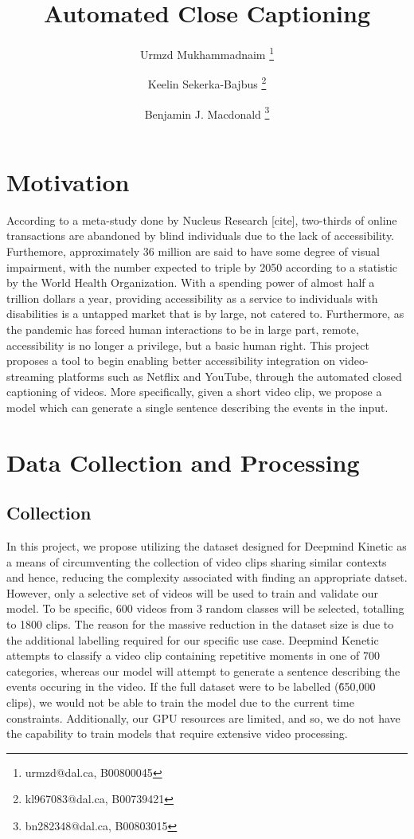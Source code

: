 \documentclass[11pt]{article}
\title{Automated Close Captioning}
\author[1]{Urmzd Mukhammadnaim \thanks{urmzd@dal.ca, B00800045}}
\author[1]{Keelin Sekerka-Bajbus \thanks{kl967083@dal.ca, B00739421 }}
\author[1]{Benjamin J. Macdonald \thanks{bn282348@dal.ca, B00803015}}
\affil[1]{Faculty of Computer Science, Dalhousie University}
\begin{document}
\maketitle

\section{Motivation}
According to a meta-study done by Nucleus Research [cite], two-thirds
of online transactions are abandoned by blind individuals due to the lack of accessibility.
Furthemore, approximately 36 million are said to have some degree of visual impairment, with the number
expected to triple by 2050 according to a statistic by the World Health Organization.
With a spending power of almost half a trillion dollars a year, providing accessibility
as a service to individuals with disabilities is a untapped market that is by large, not catered to.
Furthermore, as the pandemic has forced human interactions to be in large part, remote, accessibility is no longer
a privilege, but a basic human right. This project proposes a tool to begin enabling better accessibility
integration on video-streaming platforms such as Netflix and YouTube, through the automated
closed captioning of videos. More specifically, given a short video clip, we propose a model which
can generate a single sentence describing the events in the input.

\newpage
\section{Data Collection and Processing}
\subsection{Collection}
In this project, we propose utilizing the dataset designed for Deepmind Kinetic as a means of
circumventing the collection of video clips sharing similar contexts and hence, reducing the complexity associated
with finding an appropriate datset. However, only a selective set of videos will be used to train and validate
our model. To be specific, 600 videos from 3 random classes will be selected, totalling
to 1800 clips. The reason for the massive reduction in the dataset size is due to the additional labelling
required for our specific use case. Deepmind Kenetic attempts to classify a video clip containing repetitive moments
in one of 700 categories, whereas our model will attempt to generate a sentence describing the events occuring in the video.
If the full dataset were to be labelled (\~650,000 clips), we would not be able to train the model due to the current time
constraints. Additionally, our GPU resources are limited, and so, we do not have the capability to train models
that require extensive video processing.
\end{document}
